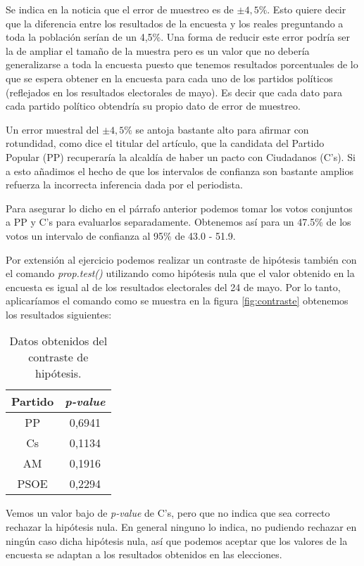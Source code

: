 \documentclass[11pt,a4paper]{article}
\begin{document}
Se indica en la noticia que el error de muestreo es de $\pm4,5\%$. Esto quiere decir que la diferencia entre los resultados de la encuesta y los reales preguntando a toda la población serían de un 4,5\%. Una forma de reducir este error podría ser la de ampliar el tamaño de la muestra pero es un valor que no debería generalizarse a toda la encuesta puesto que tenemos resultados porcentuales de lo que se espera obtener en la encuesta para cada uno de los partidos políticos (reflejados en los resultados electorales de mayo). Es decir que cada dato para cada partido político obtendría su propio dato de error de muestreo.

Un error muestral del $\pm4,5\%$ se antoja bastante alto para afirmar con rotundidad, como dice el titular del artículo, que la candidata del  Partido Popular (PP) recuperaría la alcaldía de haber un pacto con Ciudadanos (C's). Si a esto añadimos el hecho de que los intervalos de confianza son bastante amplios refuerza la incorrecta inferencia dada por el periodista.

Para asegurar lo dicho en el párrafo anterior podemos tomar los votos conjuntos a PP y C's para evaluarlos separadamente. Obtenemos así para un 47.5\% de los votos un intervalo de confianza al 95\% de 43.0 - 51.9.

Por extensión al ejercicio podemos realizar un contraste de hipótesis también con el comando \textit{prop.test()} utilizando como hipótesis nula que el valor obtenido en la encuesta es igual al de los resultados electorales del 24 de mayo. Por lo tanto, aplicaríamos el comando como se muestra en la figura \ref{fig:contraste} obtenemos los resultados siguientes:

\begin{table}[ht]
	\centering
	\begin{tabular}{cc}
	\toprule[0.4mm]
	Partido & \textit{p-value}\\
	\midrule
	PP & {\color{green} 0,6941} \\
	Cs & {\color{orange} 0,1134} \\
	AM & {\color{green} 0,1916} \\
	PSOE & {\color{green} 0,2294} \\
	\bottomrule[0.4mm]
	\end{tabular}
	\caption{Datos obtenidos del contraste de hipótesis.}
\label{tab:contraste}
\end{table}

Vemos un valor bajo de \textit{p-value} de C's, pero que no indica que sea correcto rechazar la hipótesis nula. En general ninguno lo indica, no pudiendo rechazar en ningún caso dicha hipótesis nula, así que podemos aceptar que los valores de la encuesta se adaptan a los resultados obtenidos en las elecciones.
\end{document}
